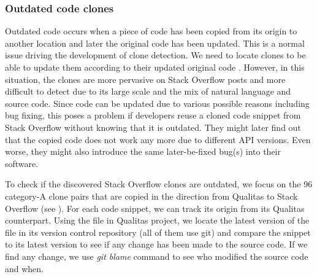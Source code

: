 \documentclass{sig-alternate-05-2015}
\begin{document}
\subsubsection{Outdated code clones}
Outdated code occurs when a piece of code has been copied from its origin to another location and later the original code has been updated. This is a normal issue driving the development of clone detection. We need to locate clones to be able to update them according to their updated original code \cite{somewhere,somewhere_else}. However, in this situation, the clones are more pervasive on Stack Overflow posts and more difficult to detect due to its large scale and the mix of natural language and source code. Since code can be updated due to various possible reasons including bug fixing, this poses a problem if developers reuse a cloned code snippet from Stack Overflow without knowing that it is outdated. %
They might later find out that the copied code does not work any more due to different API versions. Even worse, they might also introduce the same later-be-fixed bug(s) into their software. 

To check if the discovered Stack Overflow clones are outdated, we focus on the 96 category-A clone pairs that are copied in the direction from Qualitas to Stack Overflow (see ). For each code snippet, we can track its origin from its Qualitas counterpart. Using the file in Qualitas project, we locate the latest version of the file in its version control repository (all of them use git) and compare the snippet to its latest version to see if any change has been made to the source code. If we find any change, we use \textit{git blame} command to see who modified the source code and when.

\end{document}
